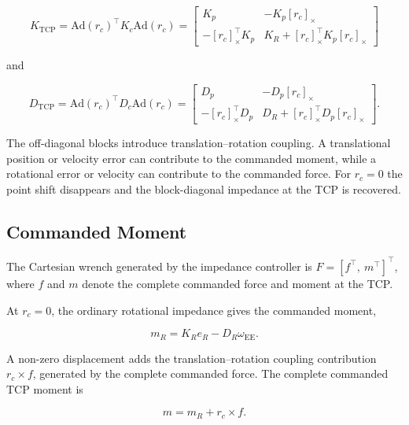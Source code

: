 \begin{equation}
K_{\mathrm{TCP}}
=
\mathrm{Ad}(r_c)^\top
K_c
\mathrm{Ad}(r_c)
=
\begin{bmatrix}
K_p
&
-K_p[r_c]_\times
\\[4pt]
-[r_c]_\times^\top K_p
&
K_R+[r_c]_\times^\top K_p[r_c]_\times
\end{bmatrix}
\label{eq:coupled_tcp_stiffness}
\end{equation}

and

\begin{equation}
D_{\mathrm{TCP}}
=
\mathrm{Ad}(r_c)^\top
D_c
\mathrm{Ad}(r_c)
=
\begin{bmatrix}
D_p
&
-D_p[r_c]_\times
\\[4pt]
-[r_c]_\times^\top D_p
&
D_R+[r_c]_\times^\top D_p[r_c]_\times
\end{bmatrix}.
\label{eq:coupled_tcp_damping}
\end{equation}

The off-diagonal blocks introduce translation--rotation coupling. A
translational position or velocity error can contribute to the
commanded moment, while a rotational error or velocity can contribute to the
commanded force. For \mbox{\(r_c=0\)} the point shift disappears and the
block-diagonal impedance at the TCP is recovered.

\subsection{Commanded Moment}
\label{subsec:coc_commanded_moment}

The Cartesian wrench generated by the impedance controller is
\mbox{\(F=[f^\top,\ m^\top]^\top\)}, where \mbox{\(f\)} and \mbox{\(m\)}
denote the complete commanded force and moment at the TCP.

At \mbox{\(r_c=0\)}, the ordinary rotational impedance gives the commanded
moment,

\begin{equation}
m_R=K_Re_R-D_R\omega_{\mathrm{EE}}.
\label{eq:zero_lever_commanded_moment}
\end{equation}

A non-zero  displacement adds the translation--rotation coupling
contribution \mbox{\(r_c\times f\)}, generated by the complete commanded
force. The complete commanded TCP moment is

\begin{equation}
m=m_R+r_c\times f.
\label{eq:commanded_moment_decomposition}
\end{equation}

